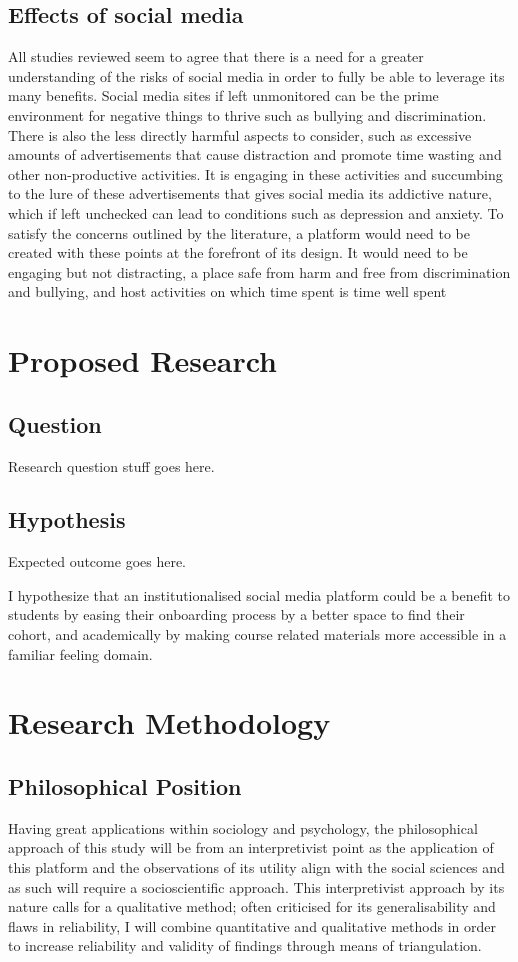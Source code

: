 \documentclass[lettersize,journal]{IEEEtran}
\begin{document}
	\subsection{Effects of social media}
	All studies reviewed seem to agree that there is a need for a greater understanding of the risks of social media in order to fully
	 be able to leverage its many benefits. Social media sites if left unmonitored can be the prime environment for negative things to thrive 
	 such as bullying and discrimination. There is also the less directly harmful aspects to consider, such as excessive amounts of advertisements that 
	 cause distraction and promote time wasting and other non-productive activities. It is engaging in these activities and succumbing to the lure of
	 these advertisements that gives social media its addictive nature, which if left unchecked can lead to conditions such as depression and anxiety.
	 To satisfy the concerns outlined by the literature, a platform would need to be created with these points at the forefront of its design.
	 It would need to be engaging but not distracting, a place safe from harm and free from discrimination and bullying, and host activities on
	 which time spent is time well spent\section{Proposed Research}
	\subsection{Question}
	Research question stuff goes here.

	\subsection{Hypothesis}
	Expected outcome goes here.

	 I hypothesize that an institutionalised social media platform
	could be a benefit to students by easing their onboarding process by a better space to find their cohort,
	and academically by making course related materials more accessible in a familiar feeling domain. 
\section{Research Methodology}

	\subsection{Philosophical Position}
	Having great applications within sociology and psychology, the philosophical approach of this study will be from an 
	interpretivist point as the application of this platform and the observations of its utility align with the social
	 sciences and as such will require a socioscientific approach. This interpretivist approach by its nature calls for a qualitative
	 method; often criticised for its generalisability and flaws in reliability, I will combine quantitative and qualitative methods
	 in order to increase reliability and validity of findings through means of triangulation.
\end{document}
